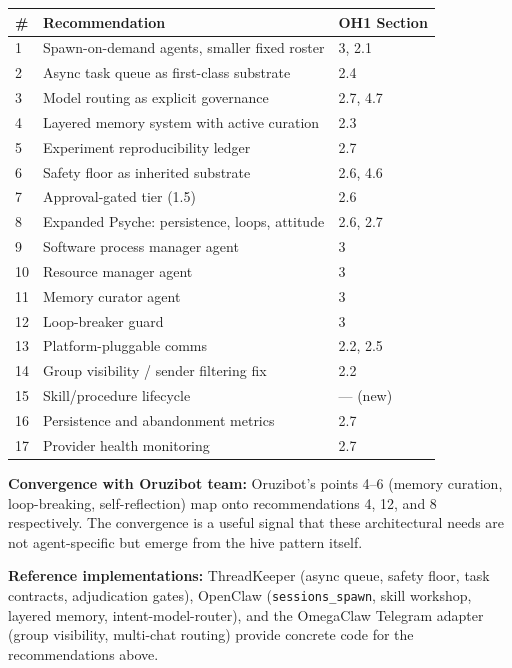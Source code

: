 \documentclass[11pt,a4paper]{article}
\begin{document}
\begin{center}
\begin{tabularx}{\textwidth}{lXl}
\toprule
\textbf{\#} & \textbf{Recommendation} & \textbf{OH1 Section} \\
\midrule
1 & Spawn-on-demand agents, smaller fixed roster & 3, 2.1 \\
2 & Async task queue as first-class substrate & 2.4 \\
3 & Model routing as explicit governance & 2.7, 4.7 \\
4 & Layered memory system with active curation & 2.3 \\
5 & Experiment reproducibility ledger & 2.7 \\
6 & Safety floor as inherited substrate & 2.6, 4.6 \\
7 & Approval-gated tier (1.5) & 2.6 \\
8 & Expanded Psyche: persistence, loops, attitude & 2.6, 2.7 \\
9 & Software process manager agent & 3 \\
10 & Resource manager agent & 3 \\
11 & Memory curator agent & 3 \\
12 & Loop-breaker guard & 3 \\
13 & Platform-pluggable comms & 2.2, 2.5 \\
14 & Group visibility / sender filtering fix & 2.2 \\
15 & Skill/procedure lifecycle & --- (new) \\
16 & Persistence and abandonment metrics & 2.7 \\
17 & Provider health monitoring & 2.7 \\
\bottomrule
\end{tabularx}
\end{center}

\vspace{1em}

\noindent\textbf{Convergence with Oruzibot team:} Oruzibot's points 4--6
(memory curation, loop-breaking, self-reflection) map onto recommendations
4, 12, and 8 respectively. The convergence is a useful signal that these
architectural needs are not agent-specific but emerge from the hive
pattern itself.

\vspace{1em}

\noindent\textbf{Reference implementations:} ThreadKeeper (async queue,
safety floor, task contracts, adjudication gates), OpenClaw
(\texttt{sessions\_spawn}, skill workshop, layered memory, intent-model-router),
and the OmegaClaw Telegram adapter (group visibility, multi-chat routing)
provide concrete code for the recommendations above.
\end{document}
